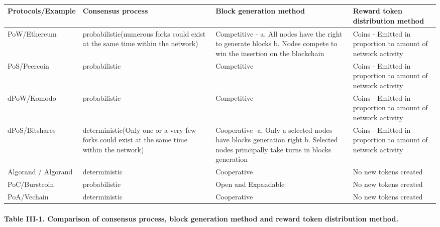 \documentclass[]{article}
\begin{document}
\begin{CJK*}{UTF8}{gbsn}
\paragraph{}
\begin{tabular}{p{2cm}p{3cm}p{3cm}p{3cm}}
\hline
Protocols/E\-xample  & Consensus process & Block generation method & Reward token distribution method \\ \hline

PoW/Ethe\-reum  
& probabilistic(nume\-rous forks could exist at the same time within the network) 
& Competitive - \newline a. All nodes have the right to generate blocks \newline b. Nodes compete to win the insertion on the blockchain 
& Coins - Emitted in proportion to amount of network activity \\ \hline

PoS/Peercoin 
& probabilistic
& Competitive 
& Coins - Emitted in proportion to amount of network activity \\ \hline

dPoW/Komo\-do  
& probabilistic
& Competitive 
&  Coins - Emitted in proportion to amount of network activity\\ \hline

dPoS/\newline Bitshares  
& deterministic(Only one or a very few forks could exist at the same time within the network)
& Cooperative -\newline a. Only a selected nodes have blocks generation right \newline b. Selected nodes principally take turns in blocks generation 
& Coins - Emitted in proportion to amount of network activity \\ \hline

Algorand / Algorand
& deterministic 
& Cooperative 
& No new tokens created \\ \hline

PoC/Burst\-coin & probabilistic & Open and Expandable & No new tokens created \\ \hline
PoA/Vechain & deterministic & Cooperative & No new tokens created \\ \hline
\end{tabular}
\paragraph{Table III-1. Comparison of consensus process, block generation method and reward token distribution method.}

\end{CJK*}
\end{document}
